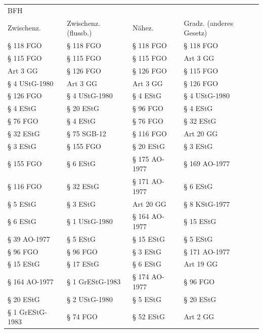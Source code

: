 \begin{tabular}{llll}
\toprule
\multicolumn{4}{l}{BFH} \\
     Zwischenz. & Zwischenz. (flussb.) &        Nähez. & Gradz. (anderes Gesetz) \\
\midrule
      § 118 FGO &            § 118 FGO &     § 118 FGO &               § 118 FGO \\
      § 115 FGO &            § 115 FGO &     § 115 FGO &                Art 3 GG \\
       Art 3 GG &            § 126 FGO &     § 126 FGO &               § 115 FGO \\
  § 4 UStG-1980 &             Art 3 GG &      Art 3 GG &               § 126 FGO \\
      § 126 FGO &        § 4 UStG-1980 &      § 4 EStG &           § 4 UStG-1980 \\
       § 4 EStG &            § 20 EStG &      § 96 FGO &                § 4 EStG \\
       § 76 FGO &             § 4 EStG &      § 76 FGO &               § 32 EStG \\
      § 32 EStG &          § 75 SGB-12 &     § 116 FGO &               Art 20 GG \\
       § 3 EStG &            § 155 FGO &     § 20 EStG &                § 3 EStG \\
      § 155 FGO &             § 6 EStG & § 175 AO-1977 &           § 169 AO-1977 \\
      § 116 FGO &            § 32 EStG & § 171 AO-1977 &                § 6 EStG \\
       § 5 EStG &             § 3 EStG &     Art 20 GG &           § 8 KStG-1977 \\
       § 6 EStG &        § 1 UStG-1980 & § 164 AO-1977 &               § 15 EStG \\
   § 39 AO-1977 &             § 5 EStG &     § 15 EStG &                § 5 EStG \\
       § 96 FGO &             § 96 FGO &      § 3 EStG &           § 171 AO-1977 \\
      § 15 EStG &            § 17 EStG &      § 6 EStG &               Art 19 GG \\
  § 164 AO-1977 &      § 1 GrEStG-1983 & § 174 AO-1977 &                § 96 FGO \\
      § 20 EStG &        § 2 UStG-1980 &      § 5 EStG &               § 20 EStG \\
§ 1 GrEStG-1983 &             § 74 FGO &     § 52 EStG &                Art 2 GG \\

\end{tabular}
